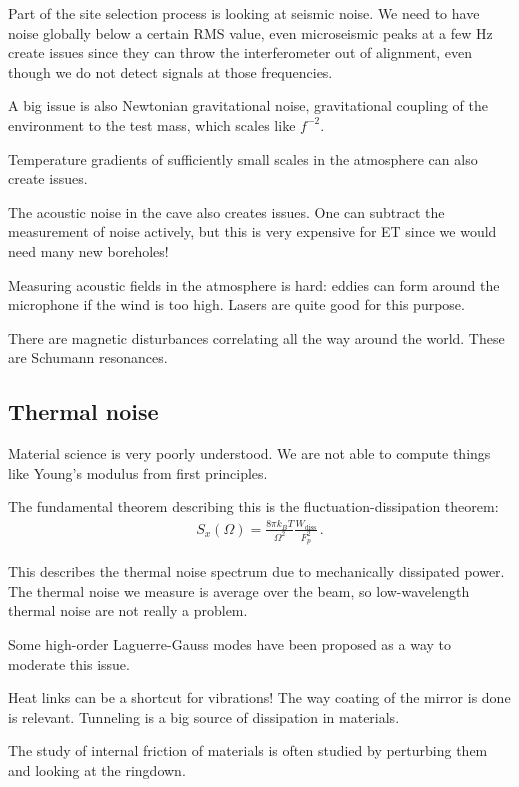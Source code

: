 \documentclass[main.tex]{subfiles}
\begin{document}
Part of the site selection process is looking at seismic noise. 
We need to have noise globally below a certain RMS value, 
even microseismic peaks at a few Hz create issues since they can throw 
the interferometer out of alignment, 
even though we do not detect signals at those frequencies. 

A big issue is also Newtonian gravitational noise, 
gravitational coupling of the environment to the test mass, which scales like \(f^{-2}\). 

Temperature gradients of sufficiently small scales in the atmosphere can also create issues. 

The acoustic noise in the cave also creates issues.
One can subtract the measurement of noise actively, but this is 
very expensive for ET since we would need many new boreholes! 

Measuring acoustic fields in the atmosphere is hard: eddies can form around the 
microphone if the wind is too high. 
Lasers are quite good for this purpose.

There are magnetic disturbances correlating all the way around the world. 
These are Schumann resonances. 

\subsection{Thermal noise}

Material science is very poorly understood.
We are not able to compute things like Young's modulus from first principles. 

The fundamental theorem describing this is the fluctuation-dissipation theorem: 
%
\begin{align}
S_x(\Omega ) = \frac{ 8 \pi k_B T}{\Omega^2} \frac{W _{\text{diss}}}{F_p^2}
\,.
\end{align}

This describes the thermal noise spectrum due to mechanically dissipated power. 
The thermal noise we measure is average over the beam, so low-wavelength 
thermal noise are not really a problem. 

Some high-order Laguerre-Gauss modes have been proposed as a way to moderate this issue.

Heat links can be a shortcut for vibrations! 
The way coating of the mirror is done is relevant. 
Tunneling is a big source of dissipation in materials. 

The study of internal friction of materials is often studied by 
perturbing them and looking at the ringdown. 
\end{document}
